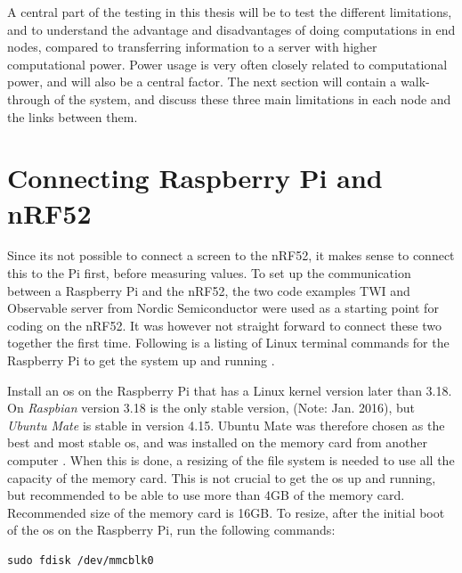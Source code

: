 \noindent A central part of the testing in this thesis will be to test the different limitations, and to understand the advantage and disadvantages of doing computations in end nodes, compared to transferring  information to a server with higher computational power. Power usage is very often closely related to computational power, and will also be a central factor. The next section will contain a walk-through of the system, and discuss these three main limitations in each node and the links between them.


\section{Connecting Raspberry Pi and nRF52}


\noindent Since its not possible to connect a screen to the \gls{nRF52}, it makes sense to connect this to the Pi first, before measuring values. To set up the communication between a \gls{Raspberry Pi} and the \gls{nRF52}, the two code examples TWI and Observable server from Nordic Semiconductor were used as a starting point for coding on the nRF52. It was however not straight forward to connect these two together the first time. Following is a listing of Linux terminal commands for the \gls{Raspberry Pi} to get the system up and running \cite{nordicNrfDocumentation}. 


\noindent Install an \gls{os} on the Raspberry Pi that has a Linux kernel version later than 3.18. On \textit{Raspbian} version 3.18 is the only stable version, (Note: Jan. 2016), but \textit{Ubuntu Mate} is stable in version 4.15. Ubuntu Mate was therefore chosen as the best and most stable \gls{os}, and was installed on the memory card from another computer \cite{ubuntuMate}. When this is done, a resizing of the file system is needed to use all the capacity of the memory card. This is not crucial to get the \gls{os} up and running, but recommended to be able to use more than 4GB of the memory card. Recommended size of the memory card is 16GB. To resize, after the initial boot of the \gls{os} on the \gls{Raspberry Pi}, run the following commands: 

\begin{verbatim}
sudo fdisk /dev/mmcblk0
\end{verbatim}


